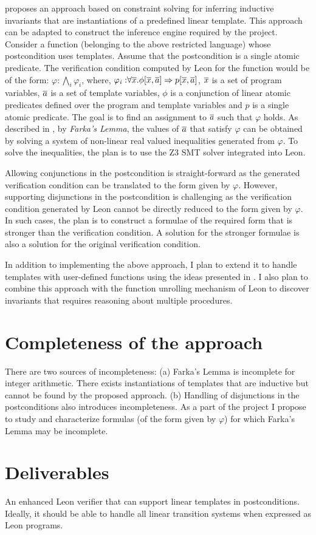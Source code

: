\documentclass[a4paper,10pt]{article}
\begin{document}
\cite{ssriram:CAV03,ssriram:SAS04} proposes an approach based on constraint solving for inferring  inductive invariants that are instantiations of a predefined linear template. This approach can be adapted to construct the inference engine required by the project. Consider a function (belonging to the above restricted language) whose postcondition uses templates. Assume that the postcondition is a single atomic predicate. The verification condition computed by Leon for the function would be of the form: $\varphi: \bigwedge_i \varphi_i$, where,
$\mathit{\varphi_i: } \forall \overline{x}. \phi[\overline{x},\overline{a}] \Rightarrow p[\overline{x},\overline{a}]$, $\overline{x}$ is a set of program variables, $\overline{a}$ is a set of template variables, $\phi$ is a conjunction of linear atomic predicates defined over the program and template variables and $p$ is a single atomic predicate.
The goal is to find an assignment to $\overline{a}$ such that $\varphi$ holds.
As described in \cite{ssriram:CAV03}, by \textit{Farka's Lemma}, the values of $\overline{a}$ that satisfy $\varphi$ can be obtained by solving a system of non-linear real valued inequalities generated from $\varphi$. To solve the inequalities, the plan is to use the Z3 SMT solver integrated into Leon.

Allowing conjunctions in the postcondition is straight-forward as the generated  verification condition can be translated to the  form given by $\varphi$. However, supporting disjunctions in the postcondition is challenging as the verification condition generated by Leon cannot be directly reduced to the form given by $\varphi$. In such cases, the plan is to construct a formulae of the required form that is stronger than the verification condition. A solution for the stronger formulae is also a solution 
for the original verification condition.

In addition to implementing the above approach, I plan to extend it to handle templates with user-defined functions using the ideas presented in \cite{dirk:VMCAI07}. I also plan to combine this approach with the function unrolling mechanism of Leon to discover invariants that requires reasoning about multiple procedures.
 
\section{Completeness of the approach}

There are two sources of incompleteness: (a) Farka's Lemma is incomplete for integer arithmetic. There exists instantiations of templates that are inductive but cannot be found by the proposed approach. (b) Handling of disjunctions in the postconditions also introduces incompleteness.
As a part of the project I propose to study and characterize formulas (of the form given by $\varphi$) for which Farka's Lemma may be incomplete.

\section{Deliverables}

An enhanced Leon verifier that can support linear templates in postconditions. Ideally, it should be able to handle all linear transition systems when expressed as Leon programs.



\end{document}
